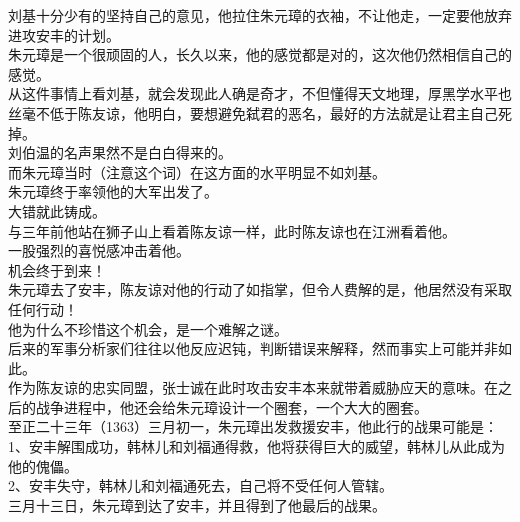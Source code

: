 \begin{multicols}{\theparacolNo}
刘基十分少有的坚持自己的意见，他拉住朱元璋的衣袖，不让他走，一定要他放弃进攻安丰的计划。\\

朱元璋是一个很顽固的人，长久以来，他的感觉都是对的，这次他仍然相信自己的感觉。\\

从这件事情上看刘基，就会发现此人确是奇才，不但懂得天文地理，厚黑学水平也丝毫不低于陈友谅，他明白，要想避免弑君的恶名，最好的方法就是让君主自己死掉。\\

刘伯温的名声果然不是白白得来的。\\

而朱元璋当时（注意这个词）在这方面的水平明显不如刘基。\\

朱元璋终于率领他的大军出发了。\\

大错就此铸成。\\

与三年前他站在狮子山上看着陈友谅一样，此时陈友谅也在江洲看着他。\\

一股强烈的喜悦感冲击着他。\\

机会终于到来！\\

朱元璋去了安丰，陈友谅对他的行动了如指掌，但令人费解的是，他居然没有采取任何行动！\\

他为什么不珍惜这个机会，是一个难解之谜。\\

后来的军事分析家们往往以他反应迟钝，判断错误来解释，然而事实上可能并非如此。\\

作为陈友谅的忠实同盟，张士诚在此时攻击安丰本来就带着威胁应天的意味。在之后的战争进程中，他还会给朱元璋设计一个圈套，一个大大的圈套。\\

至正二十三年（1363）三月初一，朱元璋出发救援安丰，他此行的战果可能是：\\

1、安丰解围成功，韩林儿和刘福通得救，他将获得巨大的威望，韩林儿从此成为他的傀儡。\\

2、安丰失守，韩林儿和刘福通死去，自己将不受任何人管辖。\\

三月十三日，朱元璋到达了安丰，并且得到了他最后的战果。\\


\end{multicols}
